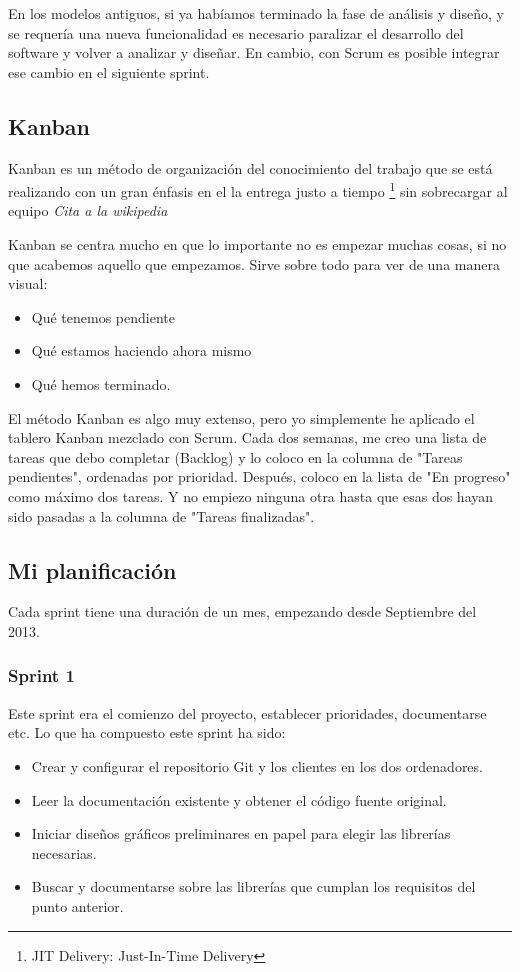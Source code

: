 En los modelos antiguos, si ya habíamos terminado la fase de análisis y diseño, y se requería una nueva funcionalidad es necesario paralizar el desarrollo del software y volver a analizar y diseñar. En cambio, con Scrum es posible integrar ese cambio en el siguiente sprint.

\subsection{Kanban}
Kanban es un método de organización del conocimiento del trabajo que se está realizando con un gran énfasis en el la entrega justo a tiempo \footnote{JIT Delivery: Just-In-Time Delivery} sin sobrecargar al equipo \emph{Cita a la wikipedia}

Kanban se centra mucho en que lo importante no es empezar muchas cosas, si no que acabemos aquello que empezamos. Sirve sobre todo para ver de una manera visual:
\begin{itemize}
    \item Qué tenemos pendiente
    \item Qué estamos haciendo ahora mismo
    \item Qué hemos terminado.
\end{itemize}

El método Kanban es algo muy extenso, pero yo simplemente he aplicado el tablero Kanban mezclado con Scrum. Cada dos semanas, me creo una lista de tareas que debo completar (Backlog) y lo coloco en la columna de "Tareas pendientes", ordenadas por prioridad. Después, coloco en la lista de "En progreso" como máximo dos tareas. Y no empiezo ninguna otra hasta que esas dos hayan sido pasadas a la columna de "Tareas finalizadas".

\subsection{Mi planificaci\'{o}n}
Cada sprint tiene una duraci\'{o}n de un mes, empezando desde Septiembre del 2013.
\subsubsection{Sprint 1}
Este sprint era el comienzo del proyecto, establecer prioridades, documentarse etc. Lo que ha compuesto este sprint ha sido:

\begin{itemize}
    \item Crear y configurar el repositorio Git y los clientes en los dos ordenadores.
    \item Leer la documentaci\'{o}n existente y obtener el c\'{o}digo fuente original.
    \item Iniciar dise\~{n}os gr\'{a}ficos preliminares en papel para elegir las librer\'{i}as necesarias.
    \item Buscar y documentarse sobre las librer\'{i}as que cumplan los requisitos del punto anterior. 
\end{itemize} 

